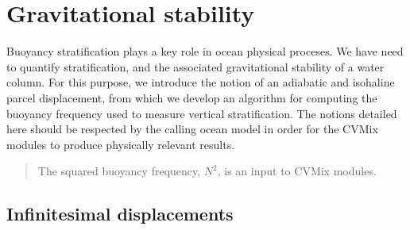 \section{Gravitational stability}
\label{section:buoyancy-frequency-elements}

Buoyancy stratification plays a key role in ocean physical proceses.
We have need to quantify stratification, and the associated
gravitational stability of a water column.  For this purpose, we
introduce the notion of an adiabatic and isohaline parcel
displacement, from which we develop an algorithm for computing the
buoyancy frequency used to measure vertical stratification.  The
notions detailed here should be respected by the calling ocean model
in order for the CVMix modules to produce physically relevant results.
\begin{quote}
  {\sf The squared buoyancy frequency, $N^2$, is an input to CVMix
    modules.}
\end{quote}


\subsection{Infinitesimal displacements}

